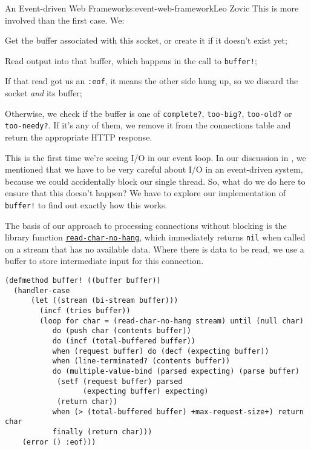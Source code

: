 \begin{aosachapter}{An Event-driven Web Framework}{s:event-web-framework}{Leo Zovic}
This is more involved than the first case. We:

\begin{aosaenumerate}
\def\labelenumi{\arabic{enumi}.}

\item
  Get the buffer associated with this socket, or create it if it doesn't
  exist yet;
\item
  Read output into that buffer, which happens in the call to
  \texttt{buffer!};
\item
  If that read got us an \texttt{:eof}, it means the other side hung up,
  so we discard the socket \emph{and} its buffer;
\item
  Otherwise, we check if the buffer is one of \texttt{complete?},
  \texttt{too-big?}, \texttt{too-old?} or \texttt{too-needy?}. If it's
  any of them, we remove it from the connections table and return the
  appropriate HTTP response.
\end{aosaenumerate}

This is the first time we're seeing I/O in our event loop. In our
discussion in , we mentioned that
we have to be very careful about I/O in an event-driven system, because
we could accidentally block our single thread. So, what do we do here to
ensure that this doesn't happen? We have to explore our implementation
of \texttt{buffer!} to find out exactly how this works.

\label{processing-connections-without-blocking}

The basis of our approach to processing connections without blocking is
the library function
\href{http://clhs.lisp.se/Body/f_rd_c_1.htm}{\texttt{read-char-no-hang}},
which immediately returns \texttt{nil} when called on a stream that has
no available data. Where there is data to be read, we use a buffer to
store intermediate input for this connection.

\begin{verbatim}
(defmethod buffer! ((buffer buffer))
  (handler-case
      (let ((stream (bi-stream buffer)))
        (incf (tries buffer))
        (loop for char = (read-char-no-hang stream) until (null char)
           do (push char (contents buffer))
           do (incf (total-buffered buffer))
           when (request buffer) do (decf (expecting buffer))
           when (line-terminated? (contents buffer))
           do (multiple-value-bind (parsed expecting) (parse buffer)
            (setf (request buffer) parsed
                  (expecting buffer) expecting)
            (return char))
           when (> (total-buffered buffer) +max-request-size+) return char
           finally (return char)))
    (error () :eof)))
\end{verbatim}


\end{aosachapter}
